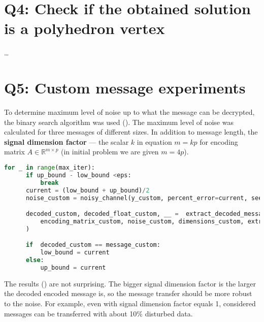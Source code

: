 \documentclass{article}
\def\R{\mathbb{R}}
\begin{document}
\section{Q4: Check if the obtained solution is a polyhedron vertex}
\ldots

\section{Q5: Custom message experiments}

To determine maximum level of noise up to what the message can be decrypted, the binary search algorithm was used (). The maximum level of noise was calculated for three messages of different sizes.  In addition to message length, the \textbf{signal dimension factor} --- the scalar $k$ in equation $m=kp$ for encoding matrix $A \in \R^{m \times p}$ (in initial problem we are given $m=4p$).

\begin{minipage}{\linewidth}
  \begin{lstlisting}[language=Python, caption={Binary search used to determine maximum level of noise up to what the message can be decrypted. \textit{extract\_fn} is either \textit{extract\_message\_geometric} or \textit{extract\_message\_standard}}, label={lst:bin}]
  for _ in range(max_iter):
      if up_bound - low_bound <eps:
          break
      current = (low_bound + up_bound)/2
      noise_custom = noisy_channel(y_custom, percent_error=current, seed=seed)

      decoded_custom, decoded_float_custom, __ =  extract_decoded_message(
          encoding_matrix_custom, noise_custom, dimensions_custom, extract_fn
      )

      if  decoded_custom == message_custom:
          low_bound = current
      else:
          up_bound = current
\end{lstlisting}
\end{minipage}

The results () are not surprising. The bigger signal dimension factor is the larger the decoded encoded message is, so the message transfer should be more robust to the noise. For example, even with signal dimension factor equals 1, considered messages can be transferred with about 10\% disturbed data.
\end{document}
